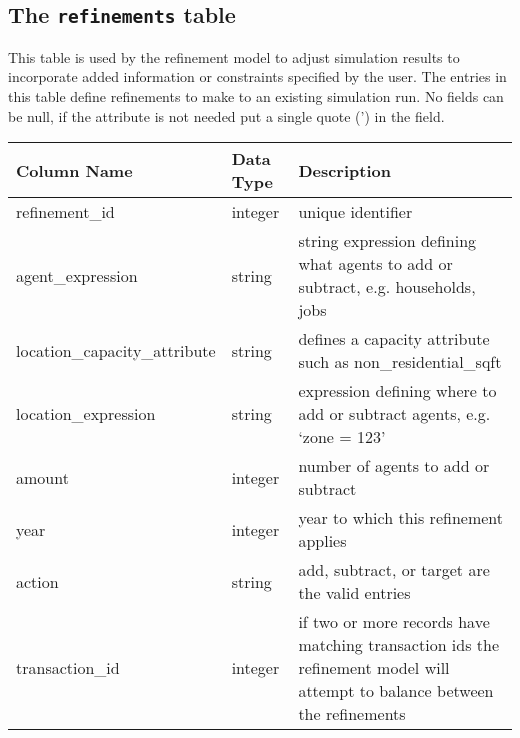 \subsection{The {\tt refinements} table}
\label{sec:db-tables-refinements}

This table is used by the refinement model to adjust simulation results to incorporate added information or constraints specified by the user. The entries in this table define refinements to make to an existing simulation run. No fields can be null, if the attribute is not needed put a single quote (') in the field.

\begin{tabular}{p{2.3in}lp{3.2in}}
\textbf{Column Name} & \textbf{Data Type} & \textbf{Description} \\
\hline
refinement\_id & integer & unique identifier\\ \hline
agent\_expression & string & string expression defining what agents to add or subtract, e.g. households, jobs\\ \hline
location\_capacity\_attribute & string & defines a capacity attribute such as non\_residential\_sqft\\ \hline
location\_expression & string & expression defining where to add or subtract agents, e.g. `zone = 123'\\ \hline
amount & integer & number of agents to add or subtract\\ \hline
year & integer & year to which this refinement applies\\ \hline
action & string & add, subtract, or target are the valid entries\\ \hline
transaction\_id & integer & if two or more records have matching transaction ids the refinement model will attempt to balance between the refinements \\ \hline
\end{tabular}
